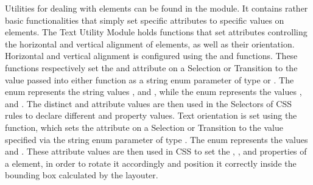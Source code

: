 Utilities for dealing with  elements can be found in the  module.
It contains rather basic functionalities that simply set specific  attributes to specific values on  elements.
The Text Utility Module holds functions that set  attributes controlling the horizontal and vertical alignment of  elements, as well as their orientation.
Horizontal and vertical alignment is configured using the  and  functions.
These functions respectively set the  and  attribute on a Selection or Transition to the value passed into either function as a string enum parameter of type  or .
The  enum represents the string values ,  and , while the  enum represents the values ,  and .
The distinct  and  attribute values are then used in the Selectors of CSS rules to declare different  and  property values.
Text orientation is set using the  function, which sets the  attribute on a Selection or Transition to the value specified via the string enum parameter of type .
The  enum represents the values  and .
These  attribute values are then used in CSS to set the , , and  properties of a  element, in order to rotate it accordingly and position it correctly inside the bounding box calculated by the layouter.


